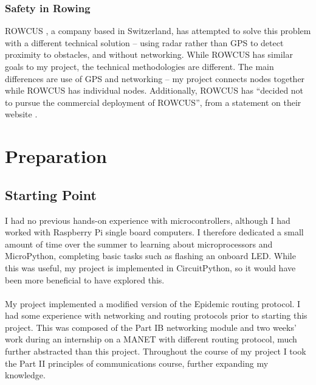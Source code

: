 \documentclass[12pt,a4paper]{report}
\newcommand{\newchapter}[2]{
    \setcounter{chapter}{#1}
    \setcounter{section}{0}
    \chapter*{#2}
    \addcontentsline{toc}{chapter}{#1 #2}
}
\begin{document}
\subsection{Safety in Rowing}
ROWCUS \cite{rowcus}, a company based in Switzerland, has attempted to solve this problem with a different technical solution -- using radar rather than GPS to detect proximity to obstacles, and without networking. While ROWCUS has similar goals to my project, the technical methodologies are different. The main differences are use of GPS and networking -- my project connects nodes together while ROWCUS has individual nodes. Additionally, ROWCUS has ``decided not to pursue the commercial deployment of ROWCUS'', from a statement on their website \cite{rowcus}.


\newchapter{2}{Preparation}

\section{Starting Point} 
I had no previous hands-on experience with microcontrollers, although I had worked with Raspberry Pi single board computers. I therefore dedicated a small amount of time over the summer to learning about microprocessors and MicroPython, completing basic tasks such as flashing an onboard LED. While this was useful, my project is implemented in CircuitPython, so it would have been more beneficial to have explored this. \\ \\
My project implemented a modified version of the Epidemic routing protocol. I had some experience with networking and routing protocols prior to starting this project. This was composed of the Part IB networking module and two weeks' work during an internship on a MANET with different routing protocol, much further abstracted than this project. Throughout the course of my project I took the Part II principles of communications course, further expanding my knowledge. 
\end{document}
